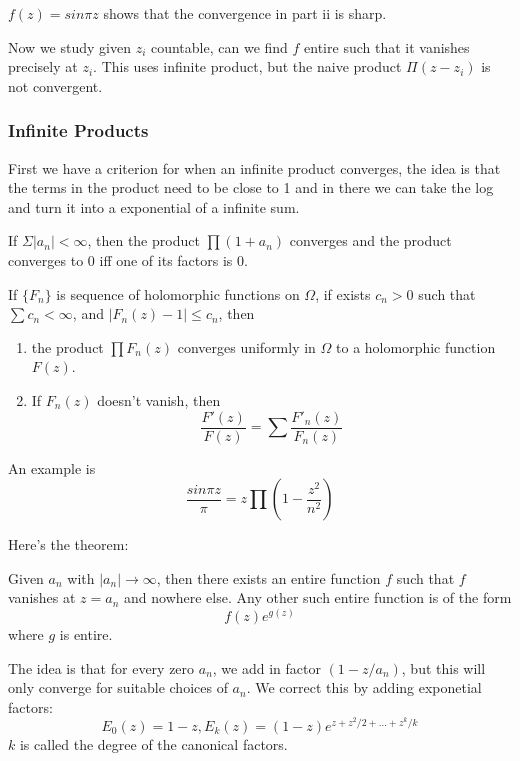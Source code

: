 \documentclass[main.tex]{subfiles}
\begin{document}
$f(z) = sin \pi z$ shows that the convergence in part ii is sharp. 

Now we study given $z_i$ countable, can we find $f$ entire such that it vanishes precisely at $z_i$. This uses infinite product, but the naive product $\Pi(z - z_i)$ is not convergent.

\subsubsection{Infinite Products}

First we have a criterion for when an infinite product converges, the idea is that the terms in the product need to be close to 1 and in there we can take the log and turn it into a exponential of a infinite sum. 

\begin{proposition}
If $\Sigma |a_n| < \infty$, then the product $\prod(1+a_n)$ converges and the product converges to $0$ iff one of its factors is 0.
\end{proposition}


\begin{proposition}
If $\{F_n\}$ is sequence of holomorphic functions on $\Omega$, if exists $c_n > 0$ such that 
$\sum c_n < \infty$, and $|F_n(z) - 1| \leq c_n$, then 
\begin{enumerate}
    \item the product $\prod F_n(z)$ converges uniformly in $\Omega$ to a holomorphic function $F(z)$.
    \item If $F_n(z)$ doesn't vanish, then
    $$
    \frac{F'(z)}{F(z)} = \sum     \frac{F'_n(z)}{F_n(z)}
    $$
\end{enumerate}
\end{proposition}

An example is 
$$
\frac{sin \pi z}{\pi } = z \prod (1 - \frac{z^2}{n^2})
$$

Here's the theorem:
\begin{theorem}
Given $a_n$ with $|a_n| \rightarrow \infty$, then there exists an entire function $f$ such that $f$ vanishes at $z = a_n$ and nowhere else. Any other such entire function is of the form 
$$
f(z) e^{g(z)}
$$
where $g$ is entire.
\end{theorem}

The idea is that for every zero $a_n$, we add in factor $(1-z/a_n)$, but this will only converge for suitable choices of $a_n$. We correct this by adding exponetial factors:
$$
E_0(z) = 1-z, E_k(z) = (1-z)e^{z + z^2/2 + ... + z^k /k}
$$
$k$ is called the degree of the canonical factors.
\end{document}
